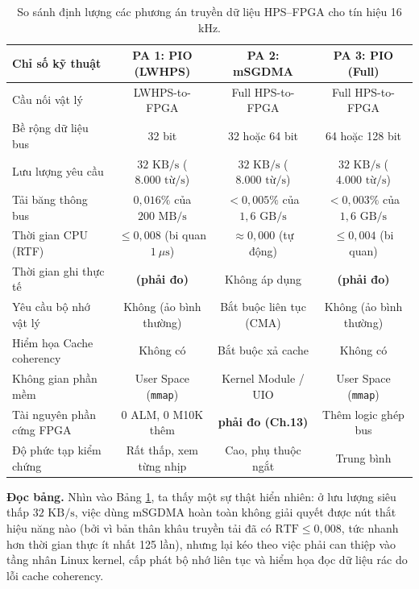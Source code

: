 \begin{table}[H]
\centering
\caption{So sánh định lượng các phương án truyền dữ liệu HPS--FPGA cho tín hiệu 16 kHz.}
\label{tab:ch01_transfer_options}
\footnotesize
\setlength{\tabcolsep}{4pt}
\begin{tabular}{lccc}
\toprule
\textbf{Chỉ số kỹ thuật} & \textbf{PA 1: PIO (LWHPS)} & \textbf{PA 2: mSGDMA} & \textbf{PA 3: PIO (Full)} \\
\midrule
Cầu nối vật lý & LWHPS-to-FPGA & Full HPS-to-FPGA & Full HPS-to-FPGA \\
Bề rộng dữ liệu bus & 32 bit & 32 hoặc 64 bit & 64 hoặc 128 bit \\
Lưu lượng yêu cầu & $32\text{ KB/s}$ ($8.000\text{ từ/s}$) & $32\text{ KB/s}$ ($8.000\text{ từ/s}$) & $32\text{ KB/s}$ ($4.000\text{ từ/s}$) \\
Tải băng thông bus & $0{,}016\%$ của $200\text{ MB/s}$ & $< 0{,}005\%$ của $1{,}6\text{ GB/s}$ & $< 0{,}003\%$ của $1{,}6\text{ GB/s}$ \\
Thời gian CPU (RTF) & $\le 0{,}008$ (bi quan $1\ \mu\text{s}$) & $\approx 0{,}000$ (tự động) & $\le 0{,}004$ (bi quan) \\
Thời gian ghi thực tế & \textbf{(phải đo)} & Không áp dụng & \textbf{(phải đo)} \\
Yêu cầu bộ nhớ vật lý & Không (ảo bình thường) & Bắt buộc liên tục (CMA) & Không (ảo bình thường) \\
Hiểm họa Cache coherency & Không có & Bắt buộc xả cache & Không có \\
Không gian phần mềm & User Space (\texttt{mmap}) & Kernel Module / UIO & User Space (\texttt{mmap}) \\
Tài nguyên phần cứng FPGA & 0 ALM, 0 M10K thêm & \textbf{phải đo (Ch.13)} & Thêm logic ghép bus \\
Độ phức tạp kiểm chứng & Rất thấp, xem từng nhịp & Cao, phụ thuộc ngắt & Trung bình \\
\bottomrule
\end{tabular}
\end{table}

\textbf{Đọc bảng.} Nhìn vào Bảng \ref{tab:ch01_transfer_options}, ta thấy một sự thật hiển nhiên: ở lưu lượng siêu thấp $32\text{ KB/s}$, việc dùng mSGDMA hoàn toàn không giải quyết được nút thắt hiệu năng nào (bởi vì bản thân khâu truyền tải đã có $\text{RTF} \le 0{,}008$, tức nhanh hơn thời gian thực ít nhất 125 lần), nhưng lại kéo theo việc phải can thiệp vào tầng nhân Linux kernel, cấp phát bộ nhớ liên tục và hiểm họa đọc dữ liệu rác do lỗi cache coherency.

